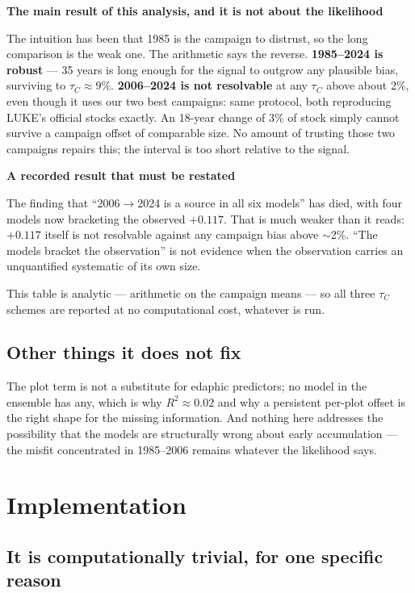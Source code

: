 \documentclass[11pt]{article}
\newenvironment{keybox}[1][]{%
  \begin{leftbar}\noindent\textbf{\small #1}\par\vspace{0.3em}\small}{\end{leftbar}}
\newenvironment{warnbox}[1][]{%
  \begin{leftbar}\noindent\textcolor{red!60!black}{\textbf{\small #1}}\par\vspace{0.3em}\small}{\end{leftbar}}
\begin{document}
\begin{keybox}[The main result of this analysis, and it is not about the likelihood]
The intuition has been that 1985 is the campaign to distrust, so the long
comparison is the weak one. The arithmetic says the reverse. \textbf{1985--2024 is
robust} --- 35 years is long enough for the signal to outgrow any plausible bias,
surviving to $\tau_C \approx 9\%$. \textbf{2006--2024 is not resolvable} at any
$\tau_C$ above about 2\%, even though it uses our two best campaigns: same protocol,
both reproducing LUKE's official stocks exactly. An 18-year change of 3\% of stock
simply cannot survive a campaign offset of comparable size. No amount of trusting
those two campaigns repairs this; the interval is too short relative to the signal.
\end{keybox}

\begin{warnbox}[A recorded result that must be restated]
The finding that ``2006$\rightarrow$2024 is a source in all six models'' has died,
with four models now bracketing the observed $+0.117$. That is much weaker than it
reads: $+0.117$ itself is not resolvable against any campaign bias above $\sim$2\%.
``The models bracket the observation'' is not evidence when the observation carries
an unquantified systematic of its own size.
\end{warnbox}

This table is analytic --- arithmetic on the campaign means --- so all three
$\tau_C$ schemes are reported at no computational cost, whatever is run.

\subsection{Other things it does not fix}

The plot term is not a substitute for edaphic predictors; no model in the ensemble
has any, which is why $R^2 \approx 0.02$ and why a persistent per-plot offset is the
right shape for the missing information. And nothing here addresses the possibility
that the models are structurally wrong about early accumulation --- the misfit
concentrated in 1985--2006 remains whatever the likelihood says.

\section{Implementation}

\subsection{It is computationally trivial, for one specific reason}
\end{document}
